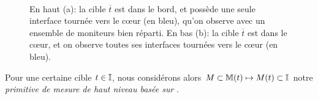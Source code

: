 \begin{figure}[!ht]\centering
{}
\\
\caption[Cas d'une cible dans le c\oe{}ur et d'une cible dans le bord]{En haut (a):
la cible $\overline{t}$ est dans le bord, et possède une seule interface tournée
vers le c\oe{}ur (en bleu), qu'on observe avec un ensemble de moniteurs bien
réparti. En bas (b): la cible $\overline{t}$ est dans le c\oe{}ur, et on observe
toutes ses interfaces tournées vers le c\oe{}ur (en bleu).}
\label{fig:udpping-core}
\end{figure}
 
Pour une certaine cible $t \in \mathbb{I}$, nous considérons alors $M \subset
{\mathbb M}(t) \mapsto M(t) \subset \mathbb{I}$ notre {\em primitive de mesure de
haut niveau basée sur \udpping}.

